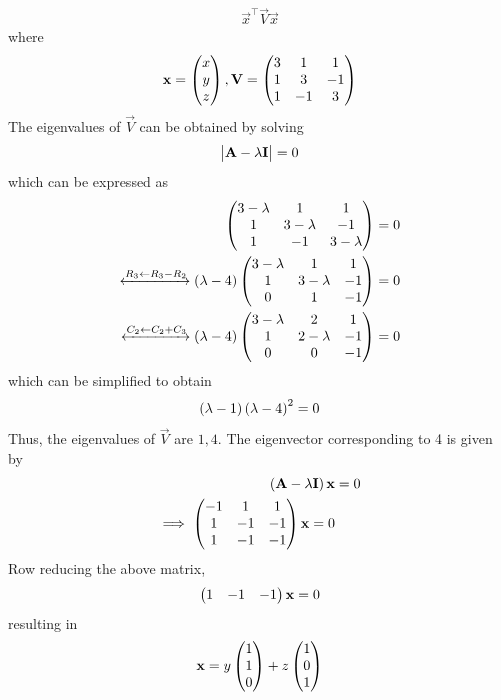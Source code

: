 \documentclass[journal,12pt,twocolumn]{IEEEtran}
\renewcommand\thesection{\arabic{section}}
\begin{document}
\begin{enumerate}[label=\thesection.\arabic*.,ref=\thesection.\theenumi]
\begin{align}
\vec{x}^{\top}
\vec{V}
\vec{x}
\end{align}
where
\begin{align}
\mathbf{x}= \begin{pmatrix}
x
\\
y
\\
z
\end{pmatrix}, 
\mathbf{V} = \begin{pmatrix}
3 & 1 & 1 
\\ 
1 & 3 & -1
\\
1 & -1 & 3
\end{pmatrix}
\end{align}
The eigenvalues of $\vec{V}$ can be obtained by solving  
\begin{align}
\begin{vmatrix}\mathbf{A}-\lambda \mathbf{I}\end{vmatrix} = 0
\end{align}
which can be expressed as 
\begin{align}
\begin{pmatrix}
3-\lambda & 1 & 1 
\\ 
1 & 3-\lambda  & -1
\\
1 & -1 & 3-\lambda 
\end{pmatrix} = 0
\\
\xleftrightarrow[]{R_3 \leftarrow R_3 -R_2}
\left(\lambda-4\right)
\begin{pmatrix}
3-\lambda & 1 & 1 
\\ 
1 & 3-\lambda  & -1
\\
0 & 1  & -1
\end{pmatrix} = 0
\\
\xleftrightarrow[]{C_2 \leftarrow C_2 +C_3}
\left(\lambda-4\right)
\begin{pmatrix}
3-\lambda & 2 & 1 
\\ 
1 & 2-\lambda  & -1
\\
0 & 0  & -1
\end{pmatrix} = 0
\end{align}
which can be simplified to obtain 
\begin{align}
\left(\lambda -1\right)
\left(\lambda -4\right)^2 = 0
\end{align}
Thus, the eigenvalues of $\vec{V}$ are $1,4$.  The eigenvector corresponding to 4 is given by 
\begin{align}
	\label{eq:jntu_eig_vec}
\left(\mathbf{A}-\lambda \mathbf{I}\right)\mathbf{x} &= 0
\\
\implies 
\begin{pmatrix}
-1 & 1 & 1 
\\ 
1 & -1 & -1
\\
1 & -1 & -1
\end{pmatrix} \mathbf{x}= 0
\end{align}
Row reducing the above matrix, 
\begin{align}
\begin{pmatrix}1 & -1 & -1
\end{pmatrix} \mathbf{x}= 0
\end{align}
resulting in 
\begin{align}
 \mathbf{x}= y\begin{pmatrix}1 \\ 1 \\ 0 
\end{pmatrix} +
 z\begin{pmatrix}1 \\ 0 \\ 1
\end{pmatrix}
\end{align}
\end{enumerate}
\end{document}

